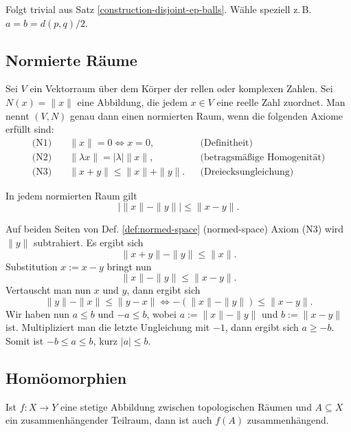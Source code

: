 \begin{Beweis}
Folgt trivial aus Satz \ref{construction-disjoint-ep-balls}.
Wähle speziell z.\,B. $a=b=d(p,q)/2$.\,\qedsymbol
\end{Beweis}

\subsection{Normierte Räume}
\begin{Definition}%
\label{def:normed-space}
Sei $V$ ein Vektorraum über dem Körper der rellen oder komplexen
Zahlen. Sei $N(x)=\|x\|$ eine Abbildung, die jedem $x\in V$ eine
reelle Zahl zuordnet. Man nennt $(V,N)$ genau dann einen
normierten Raum, wenn die folgenden Axiome erfüllt sind:
\begin{align*}
\text{(N1)}\quad &\|x\|=0\iff x=0,&&\text{(Definitheit)}\\
\text{(N2)}\quad &\|\lambda x\|=|\lambda|\|x\|,&&\text{(betragsmäßige Homogenität)}\\
\text{(N3)}\quad &\|x+y\| \le \|x\|+\|y\|.&&\text{(Dreiecksungleichung)}
\end{align*}
\end{Definition}

\begin{Satz}%
\label{rev-tineq}%
In jedem normierten Raum gilt
\[|\|x\|-\|y\|| \le \|x-y\|.\]
\end{Satz}
\begin{Beweis}
Auf beiden Seiten von Def. \ref{def:normed-space} (normed-space)
Axiom (N3) wird $\|y\|$ subtrahiert.
Es ergibt sich
\[\|x+y\| - \|y\| \le \|x\|.\]
Substitution $x:=x-y$ bringt nun
\[\|x\| - \|y\| \le \|x-y\|.\]
Vertauscht man nun $x$ und $y$, dann ergibt sich
\[\|y\|-\|x\| \le \|y-x\| \iff -(\|x\|-\|y\|)\le \|x-y\|.\]
Wir haben nun $a\le b$ und $-a\le b$,
wobei $a:=\|x\|-\|y\|$ und $b:=\|x-y\|$ ist. Multipliziert
man die letzte Ungleichung mit $-1$, dann ergibt sich $a\ge -b$.
Somit ist $-b\le a\le b$, kurz $|a|\le b$.\,\qedsymbol
\end{Beweis}

\subsection{Homöomorphien}
\begin{Satz}%
\label{intermediate-value-general}\newlinefirst
Ist $f\colon X\to Y$ eine stetige Abbildung zwischen topologischen
Räumen und $A\subseteq X$ ein zusammenhängender Teilraum,
dann ist auch $f(A)$ zusammenhängend.
\end{Satz}

